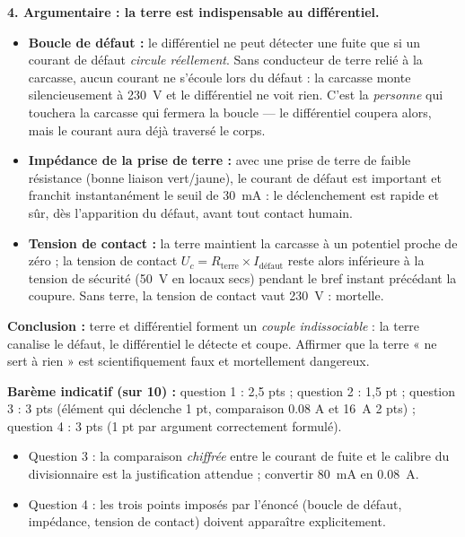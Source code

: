 \documentclass[11pt]{article}
\begin{document}
\begin{corrige}
\textbf{4. Argumentaire : la terre est indispensable au différentiel.}
\begin{itemize}
\item \textbf{Boucle de défaut :} le différentiel ne peut détecter une fuite que si un courant de défaut \emph{circule réellement}. Sans conducteur de terre relié à la carcasse, aucun courant ne s'écoule lors du défaut : la carcasse monte silencieusement à \SI{230}{V} et le différentiel ne voit rien. C'est la \emph{personne} qui touchera la carcasse qui fermera la boucle — le différentiel coupera alors, mais le courant aura déjà traversé le corps.
\item \textbf{Impédance de la prise de terre :} avec une prise de terre de faible résistance (bonne liaison vert/jaune), le courant de défaut est important et franchit instantanément le seuil de \SI{30}{mA} : le déclenchement est rapide et sûr, dès l'apparition du défaut, avant tout contact humain.
\item \textbf{Tension de contact :} la terre maintient la carcasse à un potentiel proche de zéro ; la tension de contact $U_c = R_{\text{terre}} \times I_{\text{défaut}}$ reste alors inférieure à la tension de sécurité (\SI{50}{V} en locaux secs) pendant le bref instant précédant la coupure. Sans terre, la tension de contact vaut \SI{230}{V} : mortelle.
\end{itemize}
\textbf{Conclusion :} terre et différentiel forment un \emph{couple indissociable} : la terre canalise le défaut, le différentiel le détecte et coupe. Affirmer que la terre « ne sert à rien » est scientifiquement faux et mortellement dangereux.

\medskip
\textbf{Barème indicatif (sur 10) :} question 1 : 2,5 pts ; question 2 : 1,5 pt ; question 3 : 3 pts (élément qui déclenche 1 pt, comparaison \num{0,08} A et \SI{16}{A} 2 pts) ; question 4 : 3 pts (1 pt par argument correctement formulé).
\end{corrige}

\begin{attention}
\begin{itemize}
\item Question 3 : la comparaison \emph{chiffrée} entre le courant de fuite et le calibre du divisionnaire est la justification attendue ; convertir \SI{80}{mA} en \SI{0,08}{A}.
\item Question 4 : les trois points imposés par l'énoncé (boucle de défaut, impédance, tension de contact) doivent apparaître explicitement.
\end{itemize}
\end{attention}
\end{document}
